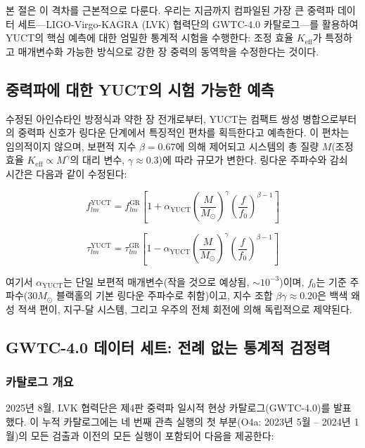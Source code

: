 \documentclass[11pt,a4paper]{article}
\theoremstyle{remark}
\newcommand{\Keff}{K_{\mathrm{eff}}}
\begin{document}
	본 절은 이 격차를 근본적으로 다룬다. 우리는 지금까지 컴파일된 가장 큰 중력파 데이터 세트—LIGO-Virgo-KAGRA (LVK) 협력단의 GWTC-4.0 카탈로그—를 활용하여 YUCT의 핵심 예측에 대한 엄밀한 통계적 시험을 수행한다: 조정 효율 $\Keff$가 특정하고 매개변수화 가능한 방식으로 강한 장 중력의 동역학을 수정한다는 것이다.
	
	\subsection{중력파에 대한 YUCT의 시험 가능한 예측}
	
	수정된 아인슈타인 방정식과 약한 장 전개로부터, YUCT는 컴팩트 쌍성 병합으로부터의 중력파 신호가 링다운 단계에서 특징적인 편차를 획득한다고 예측한다. 이 편차는 임의적이지 않으며, 보편적 지수 $\beta = 0.67$에 의해 제어되고 시스템의 총 질량 $M$(조정 효율 $\Keff \propto M^{\gamma}$의 대리 변수, $\gamma \approx 0.3$)에 따라 규모가 변한다. 링다운 주파수와 감쇠 시간은 다음과 같이 수정된다:
	
	\begin{equation}
		f_{lm}^{\text{YUCT}} = f_{lm}^{\text{GR}} \left[ 1 + \alpha_{\text{YUCT}} \left( \frac{M}{M_\odot} \right)^{\gamma} \left( \frac{f}{f_0} \right)^{\beta-1} \right]
		\label{eq:freq-mod}
	\end{equation}
	
	\begin{equation}
		\tau_{lm}^{\text{YUCT}} = \tau_{lm}^{\text{GR}} \left[ 1 - \alpha_{\text{YUCT}} \left( \frac{M}{M_\odot} \right)^{\gamma} \left( \frac{f}{f_0} \right)^{\beta-1} \right]
		\label{eq:tau-mod}
	\end{equation}
	
	여기서 $\alpha_{\text{YUCT}}$는 단일 보편적 매개변수(작을 것으로 예상됨, $\sim 10^{-3}$)이며, $f_0$는 기준 주파수($30 M_\odot$ 블랙홀의 기본 링다운 주파수로 취함)이고, 지수 조합 $\beta\gamma \approx 0.20$은 백색 왜성 적색 편이, 지구-달 시스템, 그리고 우주의 전체 회전에 의해 독립적으로 제약된다.
	
	\subsection{GWTC-4.0 데이터 세트: 전례 없는 통계적 검정력}
	
	\subsubsection{카탈로그 개요}
	
	2025년 8월, LVK 협력단은 제4판 중력파 일시적 현상 카탈로그(GWTC-4.0)를 발표했다. 이 누적 카탈로그에는 네 번째 관측 실행의 첫 부분(O4a: 2023년 5월 – 2024년 1월)의 모든 검출과 이전의 모든 실행이 포함되어 다음을 제공한다:
	
\end{document}
